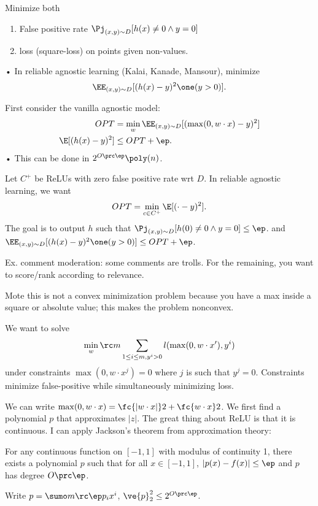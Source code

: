 Minimize both
\begin{enumerate}
\item
False positive rate $\Pj_{(x,y)\sim D}[h(x)\ne 0\wedge y=0]$
\item
loss (square-loss) on points given non-values.
\end{enumerate}•
In reliable agnostic learning (Kalai, Kanade, Mansour), minimize
$$
\EE_{(x,y)\sim D}[(h(x)-y)^2 \one(y>0)].
$$

First consider the vanilla agnostic model: 
\begin{align}
OPT &= \min_w \EE_{(x,y)\sim D} [(\max(0,w\cdot x)-y)^2]\\
\E[(h(x)-y)^2] &\le OPT+\ep.
\end{align}•
This can be done in $2^{O\prc\ep}\poly(n)$. 

Let $C^+$ be ReLUs with zero false positive rate wrt $D$. In reliable agnostic learning, we want 
$$
OPT = \min_{c\in C^+} \E[(\cdot-y)^2].
$$
The goal is to output $h$ such that $\Pj_{(x,y)\sim D} [h(0)\ne 0\wedge y=0]\le \ep$. and $\EE_{(x,y)\sim D} [(h(x)-y)^2 \one(y>0)]\le OPT+\ep$. 


Ex. comment moderation: some comments are trolls. For the remaining, you want to score/rank according to relevance.


Mote this is not a convex minimization problem because you have a max inside a square or absolute value; this makes the problem nonconvex.


We want to solve
$$
\min_w \rc m \sum_{1\le i\le m, y^i>0} l(\max(0,w\cdot x'),y^i)
$$
under constraints $\max(0,w\cdot x^j)=0$ where $j$ is such that $y^j=0$.
Constraints minimize false-positive while simultaneously minimizing loss. 

We can write $\max(0,w\cdot x) = \fc{|w\cdot x|}2+ \fc{w\cdot x}2$. We first find a polynomial $p$ that approximates $|z|$. The great thing about ReLU is that it is continuous. I can apply Jackson's theorem from approximation theory: 
\begin{thm}
For any continuous function on $[-1,1]$ with modulus of continuity 1, there exists a polynomial $p$ such that for all $x\in [-1,1]$, $|p(x) - f(x)|\le \ep$ and $p$ has degree $O\prc\ep$. 
\end{thm}
Write $p=\sumo m{\rc \ep} p_ix^i$, $\ve{p}_2^2\le 2^{O\prc\ep}$. 

